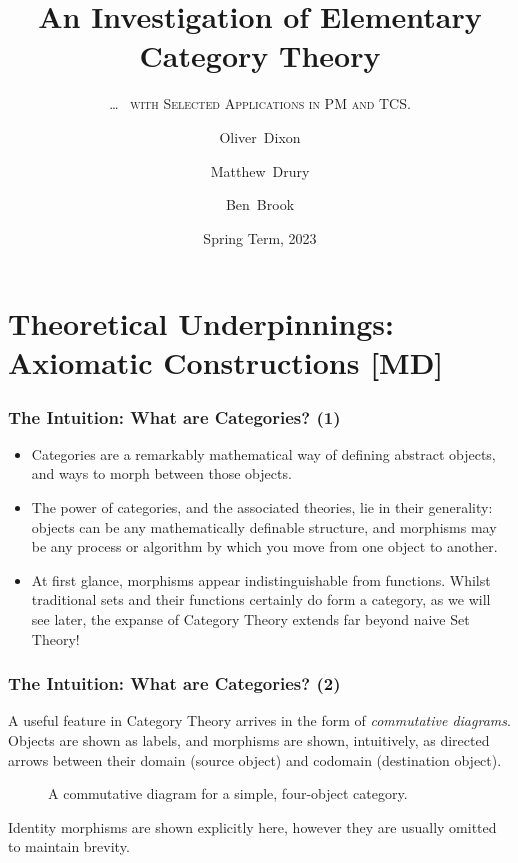 \documentclass{beamer}
\title[Elementary Category Theory]%
{An Investigation of Elementary Category Theory}
\subtitle{\ldots\ \fontfamily{lmr}%
        \textsc{with Selected Applications in PM and TCS.}}
\author[Dixon, Drury \& Brook]%
{Oliver~Dixon \and Matthew~Drury \and Ben~Brook}
\institute[]{Department of Mathematics, University of York}
\date{Spring Term, 2023}
\numberwithin{figure}{section}
\begin{document}
\frame{\titlepage}

\section{Theoretical Underpinnings: Axiomatic Constructions [MD]}

\begin{frame}
        \frametitle{The Intuition: What are Categories? (1)}
        \begin{itemize}
                \item Categories are a remarkably mathematical way of defining
                        abstract objects, and ways to morph between those
                        objects.
                \item The power of categories, and the associated theories, lie
                        in their generality: objects can be any mathematically
                        definable structure, and morphisms may be any process or
                        algorithm by which you move from one object to another.
                \item At first glance, morphisms appear indistinguishable from
                        functions. Whilst traditional sets and their functions
                        certainly do form a category, as we will see later, the
                        expanse of Category Theory extends far beyond naive Set
                        Theory!
        \end{itemize}
\end{frame}

\begin{frame}
        \frametitle{The Intuition: What are Categories? (2)}
        A useful feature in Category Theory arrives in the form of
        \emph{commutative diagrams}. Objects are shown as labels, and morphisms
        are shown, intuitively, as directed arrows between their domain (source
        object) and codomain (destination object).
        \pause
        \begin{figure}
                \caption{A commutative diagram for a simple, four-object
                        category.}
        \end{figure}
        Identity morphisms are shown explicitly here, however they are usually
        omitted to maintain brevity.
\end{frame}
\end{document}
